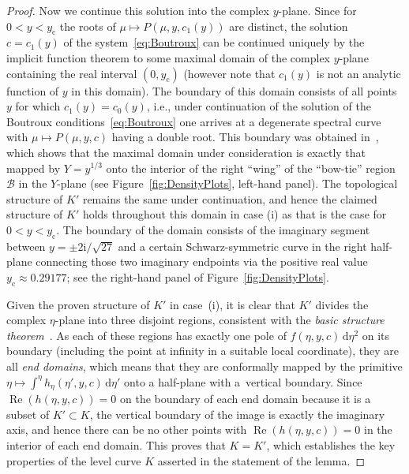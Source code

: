 \begin{proof}
Now we continue this solution into the complex $y$-plane. Since for $0<y<y_\mathrm{c}$ the roots of $\mu\mapsto P(\mu,y,c_1(y))$ are distinct, the solution $c=c_1(y)$ of the system~\eqref{eq:Boutroux} can be continued uniquely by the implicit function theorem to some maximal domain of the complex $y$-plane containing the real interval $(0,y_\mathrm{c})$ (however note that $c_1(y)$ is not an analytic function of $y$ in this domain). The boundary of this domain consists of all points $y$ for which $c_1(y)=c_0(y)$, i.e., under continuation of the solution of the Boutroux conditions~\eqref{eq:Boutroux} one arrives at a degenerate spectral curve with $\mu\mapsto P(\mu,y,c)$ having a double root. This boundary was obtained in~\cite[Section 4.7]{BuckinghamM22}, which shows that the maximal domain under consideration is exactly that mapped by $Y=y^{1/3}$ onto the interior of the right ``wing'' of the ``bow-tie'' region $\mathcal{B}$ in the $Y$-plane (see Figure~\ref{fig:DensityPlots}, left-hand panel). The topological structure of $K'$ remains the same under continuation, and hence the claimed structure of $K'$ holds throughout this domain in case (i) as that is the case for $0<y<y_\mathrm{c}$. The boundary of the domain consists of the imaginary segment between $y=\pm 2\mathrm{i}/
\sqrt{27}$ and a certain Schwarz-symmetric curve in the right half-plane connecting those two imaginary endpoints via the positive real value $y_\mathrm{c}\approx 0.29177$; see the right-hand panel of Figure~\ref{fig:DensityPlots}.

Given the proven structure of $K'$ in case~(i), it is clear that $K'$ divides the complex $\eta$-plane into three disjoint regions, consistent with the \emph{basic structure theorem}~\cite[p.~37]{Jenkins58}. As each of these regions has exactly one pole of $f(\eta,y,c)\,\mathrm{d}\eta^2$ on its boundary (including the point at infinity in a suitable local coordinate), they are all \emph{end domains}, which means that they are conformally mapped by the primitive $\eta\mapsto \int^\eta h_\eta(\eta',y,c)\,\mathrm{d}\eta'$ onto a half-plane with a~vertical boundary. Since $\operatorname{Re}(h(\eta,y,c))=0$ on the boundary of each end domain because it is a subset of $K'\subset K$, the vertical boundary of the image is exactly the imaginary axis, and hence there can be no other points with $\operatorname{Re}(h(\eta,y,c))=0$ in the interior of each end domain. This proves that $K=K'$, which establishes the key properties of the level curve $K$ asserted in the statement of the lemma.


\end{proof}
